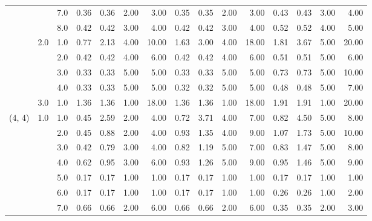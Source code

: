 \begin{tabular}{lllrrrrrrrrrrrr}
       &     & 7.0  &       0.36 &      0.36 & 2.00 &   3.00 &       0.35 &      0.35 &  2.00 &   3.00 &       0.43 &      0.43 &  3.00 &   4.00 \\
       &     & 8.0  &       0.42 &      0.42 & 3.00 &   4.00 &       0.42 &      0.42 &  3.00 &   4.00 &       0.52 &      0.52 &  4.00 &   5.00 \\
       & 2.0 & 1.0  &       0.77 &      2.13 & 4.00 &  10.00 &       1.63 &      3.00 &  4.00 &  18.00 &       1.81 &      3.67 &  5.00 &  20.00 \\
       &     & 2.0  &       0.42 &      0.42 & 4.00 &   6.00 &       0.42 &      0.42 &  4.00 &   6.00 &       0.51 &      0.51 &  5.00 &   6.00 \\
       &     & 3.0  &       0.33 &      0.33 & 5.00 &   5.00 &       0.33 &      0.33 &  5.00 &   5.00 &       0.73 &      0.73 &  5.00 &  10.00 \\
       &     & 4.0  &       0.33 &      0.33 & 5.00 &   5.00 &       0.32 &      0.32 &  5.00 &   5.00 &       0.48 &      0.48 &  5.00 &   7.00 \\
       & 3.0 & 1.0  &       1.36 &      1.36 & 1.00 &  18.00 &       1.36 &      1.36 &  1.00 &  18.00 &       1.91 &      1.91 &  1.00 &  20.00 \\
(4, 4) & 1.0 & 1.0  &       0.45 &      2.59 & 2.00 &   4.00 &       0.72 &      3.71 &  4.00 &   7.00 &       0.82 &      4.50 &  5.00 &   8.00 \\
       &     & 2.0  &       0.45 &      0.88 & 2.00 &   4.00 &       0.93 &      1.35 &  4.00 &   9.00 &       1.07 &      1.73 &  5.00 &  10.00 \\
       &     & 3.0  &       0.42 &      0.79 & 3.00 &   4.00 &       0.82 &      1.19 &  5.00 &   7.00 &       0.83 &      1.47 &  5.00 &   8.00 \\
       &     & 4.0  &       0.62 &      0.95 & 3.00 &   6.00 &       0.93 &      1.26 &  5.00 &   9.00 &       0.95 &      1.46 &  5.00 &   9.00 \\
       &     & 5.0  &       0.17 &      0.17 & 1.00 &   1.00 &       0.17 &      0.17 &  1.00 &   1.00 &       0.17 &      0.17 &  1.00 &   1.00 \\
       &     & 6.0  &       0.17 &      0.17 & 1.00 &   1.00 &       0.17 &      0.17 &  1.00 &   1.00 &       0.26 &      0.26 &  1.00 &   2.00 \\
       &     & 7.0  &       0.66 &      0.66 & 2.00 &   6.00 &       0.66 &      0.66 &  2.00 &   6.00 &       0.35 &      0.35 &  2.00 &   3.00 \\

\end{tabular}
